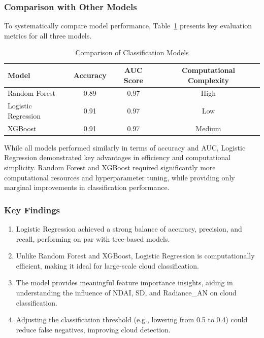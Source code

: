 \documentclass[11pt,letterpaper]{article}
\begin{document}
\vspace{1em} %
\subsubsection{Comparison with Other Models}
\vspace{0.5em} %
To systematically compare model performance, Table~\ref{tab:model_comparison} presents key evaluation metrics for all three models.

\begin{table}[h]
    \centering
    \caption{Comparison of Classification Models}
    \label{tab:model_comparison}
    \begin{tabular}{lccc}
        \toprule
        Model & Accuracy & AUC Score & Computational Complexity \\
        \midrule
        Random Forest & 0.89 & 0.97 & High \\
        Logistic Regression & 0.91 & 0.97 & Low \\
        XGBoost & 0.91 & 0.97 & Medium \\
        \bottomrule
    \end{tabular}
\end{table}

While all models performed similarly in terms of accuracy and AUC, Logistic Regression demonstrated key advantages in efficiency and computational simplicity. Random Forest and XGBoost required significantly more computational resources and hyperparameter tuning, while providing only marginal improvements in classification performance.

\vspace{1em} %
\subsubsection{Key Findings}
\vspace{0.5em} %

\begin{enumerate}
    \item Logistic Regression achieved a strong balance of accuracy, precision, and recall, performing on par with tree-based models.
    \item Unlike Random Forest and XGBoost, Logistic Regression is computationally efficient, making it ideal for large-scale cloud classification.
    \item The model provides meaningful feature importance insights, aiding in understanding the influence of NDAI, SD, and Radiance\_AN on cloud classification.
    \item Adjusting the classification threshold (e.g., lowering from 0.5 to 0.4) could reduce false negatives, improving cloud detection.
\end{enumerate}
\end{document}
